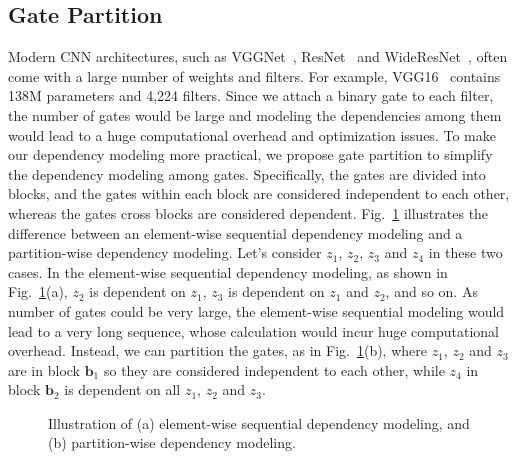 \documentclass[runningheads, envcountsame, a4paper]{llncs}
\def\bs{\boldsymbol}
\begin{document}
\subsection{Gate Partition}
Modern CNN architectures, such as VGGNet~\cite{simonyan2014very}, ResNet~\cite{he2016deep} and WideResNet~\cite{wideresnet}, often come with a large number of weights and filters. For example, VGG16~\cite{simonyan2014very} contains 138M parameters and 4,224 filters. Since we attach a binary gate to each filter, the number of gates would be large and modeling the dependencies among them would lead to a huge computational overhead and optimization issues. To make our dependency modeling more practical, we propose gate partition to simplify the dependency modeling among gates. Specifically, the gates are divided into blocks, and the gates within each block are considered independent to each other, whereas the gates cross blocks are considered dependent. Fig.~\ref{fig: gate partition} illustrates the difference between an element-wise sequential dependency modeling and a partition-wise dependency modeling. Let's consider $z_1$, $z_2$, $z_3$ and $z_4$ in these two cases. In the element-wise sequential dependency modeling, as shown in Fig.~\ref{fig: gate partition}(a), $z_2$ is dependent on $z_1$, $z_3$ is dependent on $z_1$ and $z_2$, and so on. As number of gates could be very large, the element-wise sequential modeling would lead to a very long sequence, whose calculation would incur huge computational overhead. Instead, we can partition the gates, as in Fig.~\ref{fig: gate partition}(b), where $z_1$, $z_2$ and $z_3$ are in block $\bs{b}_1$ so they are considered independent to each other, while $z_4$ in block $\bs{b}_2$ is dependent on all $z_1$, $z_2$ and $z_3$. 


\begin{figure}[t]
  \begin{center}
    \hfill
  \end{center}\vspace{-15pt}
  \caption{Illustration of (a) element-wise sequential dependency modeling, and (b) partition-wise dependency modeling.}\label{fig: gate partition}
\end{figure}
\end{document}

